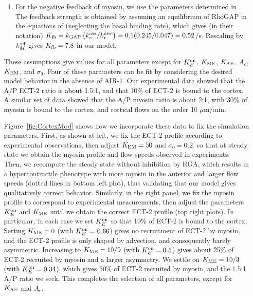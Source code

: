 \documentclass[11pt]{article}
\begin{document}
\begin{appendix}
\begin{enumerate}
\item For the negative feedback of myosin, we use the parameters determined in \citep{michaux2018excitable}. The feedback strength is obtained by assuming an equilibrium of RhoGAP in the equations of \citep{michaux2018excitable} (neglecting the basal binding rate), which gives (in their notation) $K_\text{fb}=k_\text{GAP}\left(k_r^\text{ass}/k_r^\text{diss}\right)=0.1(0.245/0.047)=0.52$/s. Rescaling by $k^\text{off}_M$ gives $K_\text{fb}=7.8$ in our model. 
\end{enumerate}
These assumptions give values for all parameters except for $K^\text{on}_E$, $K_\text{ME}$, $K_\text{AE}$, $A_c$, $K_\text{EM}$, and $\sigma_0$. Four of these parameters can be fit by considering the desired model behavior in the absence of AIR-1. Our experimental data \citep[Fig.~1]{longhini2022aurora} showed that the A/P ECT-2 ratio is about 1.5:1, and that 10\% of ECT-2 is bound to the cortex. A similar set of data \citep[Figs.~S2,S3]{gross2019guiding} showed that the A/P myosin ratio is about 2:1, with 30\% of myosin is bound to the cortex, and cortical flows on the order 10 $\mu$m/min. 

Figure\ \ref{fig:CortexMod} shows how we incorporate these data to fix the simulation parameters. First, as shown at left, we fix the ECT-2 profile according to experimental observations, then adjust $K_\text{EM}=50$ and $\sigma_0=0.2$, so that at steady state we obtain the myosin profile and flow speeds observed in experiments. Then, we recompute the steady state without inhibition by RGA, which results in a hypercontractile phenotype with more myosin in the anterior and larger flow speeds (dotted lines in bottom left plot), thus validating that our model gives qualitatively correct behavior. Similarly, in the right panel, we fix the myosin profile to correspond to experimental measurements, then adjust the parameters $K^\text{on}_E$ and $K_\text{ME}$ until we obtain the correct ECT-2 profile (top right plots). In particular, in each case we set $K^\text{on}_E$ so that 10\% of ECT-2 is bound to the cortex. Setting $K_\text{ME}=0$ (with $K^\text{on}_E=0.66$) gives no recruitment of ECT-2 by myosin, and the ECT-2 profile is only shaped by advection, and consequently barely asymmetric. Increasing to $K_\text{ME}=10/9$ (with $K^\text{on}_E=0.5$) gives about 25\% of ECT-2 recruited by myosin and a larger asymmetry. We settle on $K_\text{ME}=10/3$ (with $K^\text{on}_E=0.34$), which gives 50\% of ECT-2 recruited by myosin, and the 1.5:1 A/P ratio we seek. This completes the selection of all parameters, except for $K_\text{AE}$ and $A_c$. 


\end{appendix}
\end{document}
